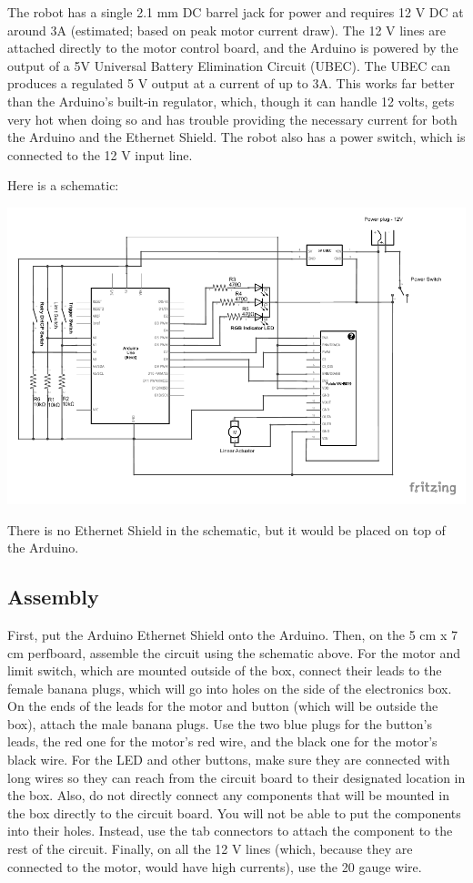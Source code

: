\documentclass[letterpaper,10pt,english]{sphinxmanual}
\begin{document}
The robot has a single 2.1 mm DC barrel jack for power and requires 12 V DC at around 3A (estimated; based on peak motor current draw). The 12 V lines are attached directly to the motor control board, and the Arduino is powered by the output of a 5V Universal Battery Elimination Circuit (UBEC). The UBEC can produces a regulated 5 V output at a current of up to 3A. This works far better than the Arduino's built-in regulator, which, though it can handle 12 volts, gets very hot when doing so and has trouble providing the necessary current for both the Arduino and the Ethernet Shield. The robot also has a power switch, which is connected to the 12 V input line.

Here is a schematic:

\includegraphics{NARFSTRCircuit_schem.pdf}

There is no Ethernet Shield in the schematic, but it would be placed on top of the Arduino.


\subsection{Assembly}
\label{NARFSTR:assembly}
First, put the Arduino Ethernet Shield onto the Arduino. Then, on the 5 cm x 7 cm perfboard, assemble the circuit using the schematic above. For the motor and limit switch, which are mounted outside of the box, connect their leads to the female banana plugs, which will go into holes on the side of the electronics box. On the ends of the leads for the motor and button (which will be outside the box), attach the male banana plugs. Use the two blue plugs for the button's leads, the red one for the motor's red wire, and the black one for the motor's black wire. For the LED and other buttons, make sure they are connected with long wires so they can reach from the circuit board to their designated location in the box. Also, do not directly connect any components that will be mounted in the box directly to the circuit board. You will not be able to put the components into their holes. Instead, use the tab connectors to attach the component to the rest of the circuit. Finally, on all the 12 V lines (which, because they are connected to the motor, would have high currents), use the 20 gauge wire.
\end{document}
